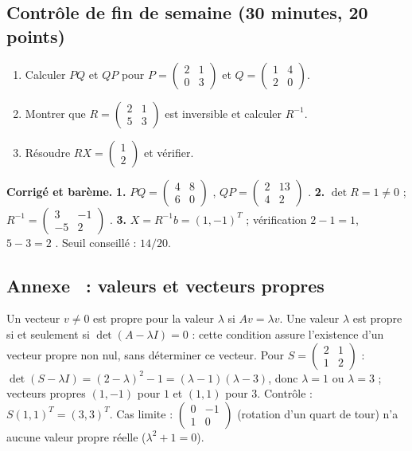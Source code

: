 \subsection{Contrôle de fin de semaine (30 minutes, 20 points)}
\begin{enumerate}
 \item {} Calculer $PQ$ et $QP$ pour $P=\begin{pmatrix}2&1\\0&3\end{pmatrix}$ et $Q=\begin{pmatrix}1&4\\2&0\end{pmatrix}$.
 \item {} Montrer que $R=\begin{pmatrix}2&1\\5&3\end{pmatrix}$ est inversible et calculer $R^{-1}$.
 \item {} Résoudre $RX=\begin{pmatrix}1\\2\end{pmatrix}$ et vérifier.
\end{enumerate}
\ifcorr
\textbf{Corrigé et barème.} \textbf{1.} $PQ=\begin{pmatrix}4&8\\6&0\end{pmatrix}$ , $QP=\begin{pmatrix}2&13\\4&2\end{pmatrix}$ . \textbf{2.} $\det R=1\ne0$  ; $R^{-1}=\begin{pmatrix}3&-1\\-5&2\end{pmatrix}$ . \textbf{3.} $X=R^{-1}b=(1,-1)^T$  ; vérification $2-1=1$, $5-3=2$ . Seuil conseillé : $14/20$.
\fi

\subsection*{Annexe \horsprog\ : valeurs et vecteurs propres}
Un vecteur $v\ne0$ est propre pour la valeur $\lambda$ si $Av=\lambda v$. Une valeur $\lambda$ est propre si et seulement si $\det(A-\lambda I)=0$ : cette condition assure l'existence d'un vecteur propre non nul, sans déterminer ce vecteur. Pour $S=\begin{pmatrix}2&1\\1&2\end{pmatrix}$ : $\det(S-\lambda I)=(2-\lambda)^2-1=(\lambda-1)(\lambda-3)$, donc $\lambda=1$ ou $\lambda=3$ ; vecteurs propres $(1,-1)$ pour $1$ et $(1,1)$ pour $3$. Contrôle : $S(1,1)^T=(3,3)^T$. Cas limite : $\begin{pmatrix}0&-1\\1&0\end{pmatrix}$ (rotation d'un quart de tour) n'a aucune valeur propre réelle ($\lambda^2+1=0$).

